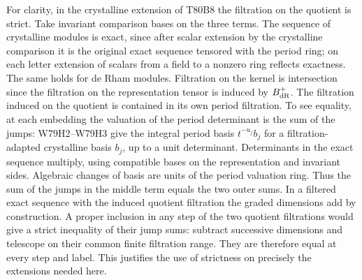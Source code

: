 For clarity, in the crystalline extension of T80B8 the filtration
on the quotient is strict. Take invariant comparison bases on the
three terms. The sequence of crystalline modules is exact, since
after scalar extension by the crystalline comparison it is the
original exact sequence tensored with the period ring; on each
letter extension of scalars from a field to a nonzero ring reflects
exactness. The same holds for de Rham modules. Filtration on the
kernel is intersection since the filtration on the representation
tensor is induced by $B_{\rm dR}^+$. The filtration induced on the
quotient is contained in its own period filtration. To see equality,
at each embedding the valuation of the period determinant is the
sum of the jumps: W79H2--W79H3 give the integral period basis
$t^{-u_j}b_j$ for a filtration-adapted crystalline basis $b_j$, up
to a unit determinant. Determinants in the exact sequence multiply,
using compatible bases on the representation and invariant sides.
Algebraic changes of basis are units of the period valuation ring.
Thus the sum of the jumps in the middle term equals the two outer
sums. In a filtered exact sequence with the induced quotient
filtration the graded dimensions add by construction. A proper
inclusion in any step of the two quotient filtrations would give a
strict inequality of their jump sums: subtract successive dimensions
and telescope on their common finite filtration range. They are
therefore equal at every step and label. This justifies the use of
strictness on precisely the extensions needed here.

